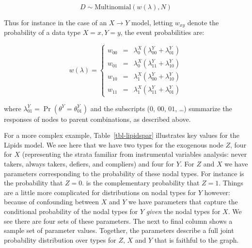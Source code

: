 \documentclass[
  11pt,
  article]{jss}
\renewcommand{\texttt}[1]{\code{#1}}
\begin{document}
\[
D \sim \text{Multinomial}(w(\lambda), N)
\]

Thus for instance in the case of an \(X \rightarrow Y\) model, letting
\(w_{xy}\) denote the probability of a data type \(X=x, Y=y\), the event
probabilities are:

\[
w(\lambda) = \left\{\begin{array}{ccc} w_{00} & = & \lambda^X_0(\lambda^Y_{00} + \lambda^Y_{01})\\ 
w_{01} & = & \lambda^X_0(\lambda^Y_{11} + \lambda^Y_{10})\\
w_{10} & = & \lambda^X_1(\lambda^Y_{00} + \lambda^Y_{10})\\
w_{11} & = & \lambda^X_1(\lambda^Y_{11} + \lambda^Y_{01})\end{array} \right.
\]

where \(\lambda^Y_{01}=\Pr(\theta^Y = \theta^Y_{01})\) and the
subscripts (\(0\), \(00\), \(01\), \dots) summarize the responses of
nodes to parent combinations, as described above.

For a more complex example, Table~\ref{tbl-lipidspar} illustrates key
values for the Lipids model. We see here that we have two types for the
exogenous node \(Z\), four for \(X\) (representing the strata familiar
from instrumental variables analysis: never takers, always takers,
defiers, and compliers) and four for \(Y\). For \(Z\) and \(X\) we have
parameters corresponding to the probability of these nodal types. For
instance \texttt{Z.0} is the probability that \(Z=0\). \texttt{Z.1} is
the complementary probability that \(Z=1\). Things are a little more
complicated for distributions on nodal types for \(Y\) however: because
of confounding between \(X\) and \(Y\) we have parameters that capture
the conditional probability of the nodal types for \(Y\) \emph{given}
the nodal types for \(X\). We see there are four sets of these
parameters. The next to final column shows a sample set of parameter
values. Together, the parameters describe a full joint probability
distribution over types for \(Z\), \(X\) and \(Y\) that is faithful to
the graph.
\end{document}

